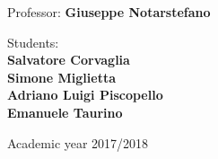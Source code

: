 \begin{flushleft}                                                                              
     {\large Professor: \textbf{\@ Giuseppe Notarstefano}} \\        
      \vspace{13mm}
\end{flushleft}
\begin{flushright}
      {\large Students:}\\
      {\textbf{Salvatore Corvaglia}}\\
 	 {\textbf{Simone Miglietta}}\\
 	 {\textbf{Adriano Luigi Piscopello}}\\
 	 {\textbf{Emanuele Taurino}}\\
\end{flushright}        %
\begin{center}
\vfill
      {\large Academic year \@2017/2018} \\
\end{center}
